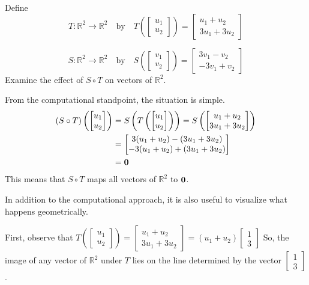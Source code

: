 \documentclass{ximera}
\renewcommand{\vec}[1]{{\bf #1}}
\newcommand{\RR}{\mathbb{R}}
\begin{document}
\begin{example}\label{ex:transcomp} Define $$T:\RR^2\rightarrow \RR^2 \quad\text{by}\quad T\left(\begin{bmatrix}u_1\\u_2\end{bmatrix}\right)=\begin{bmatrix}u_1+u_2\\3u_1+3u_2\end{bmatrix}$$

$$S:\RR^2\rightarrow \RR^2 \quad\text{by}\quad S\left(\begin{bmatrix}v_1\\v_2\end{bmatrix}\right)=\begin{bmatrix}3v_1-v_2\\-3v_1+v_2\end{bmatrix}$$
Examine the effect of $S\circ T$ on vectors of $\RR^2$.
\begin{explanation}
From the computational standpoint, the situation is simple.
\begin{align*}
(S\circ T)\left(\begin{bmatrix}u_1\\u_2\end{bmatrix}\right)&=S\left(T\left(\begin{bmatrix}u_1\\u_2\end{bmatrix}\right)\right)=S\left(\begin{bmatrix}u_1+u_2\\3u_1+3u_2\end{bmatrix}\right)\\
&=\begin{bmatrix}3(u_1+u_2)-(3u_1+3u_2)\\-3(u_1+u_2)+(3u_1+3u_2)\end{bmatrix}\\
&=\vec{0}
\end{align*}
This means that $S\circ T$ maps all vectors of $\RR^2$ to $\vec{0}$.  

In addition to the computational approach, it is also useful to visualize what happens geometrically.

First, observe that $T\left(\begin{bmatrix}u_1\\u_2\end{bmatrix}\right)=\begin{bmatrix}u_1+u_2\\3u_1+3u_2\end{bmatrix}=(u_1+u_2)\begin{bmatrix}1\\3\end{bmatrix}$  So, the image of any vector of $\RR^2$ under $T$ lies on the line determined by the vector $\begin{bmatrix}1\\3\end{bmatrix}$.  


\end{explanation}
\end{example}
\end{document}
